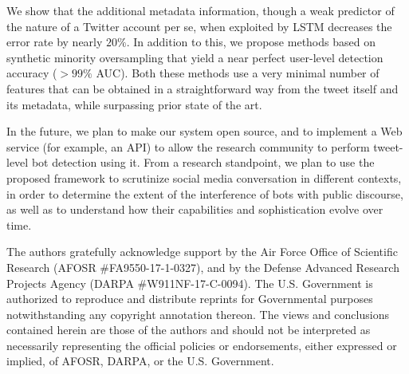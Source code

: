 We show that the additional metadata information, though a weak predictor of the nature of a Twitter account per se, when exploited by LSTM decreases the error rate by nearly $20\%$. In addition to this, we propose methods based on synthetic minority oversampling that yield a near perfect user-level detection accuracy ($>99\%$ AUC). Both these methods use a very minimal number of features that can be obtained in a straightforward way from the tweet itself and its metadata, while  surpassing prior state of the art. 

In the future, we plan to make our system open source, and to implement a Web service (for example, an API) to allow the research community to perform tweet-level bot detection using it. From a research standpoint, we plan to use the proposed framework to scrutinize social media conversation in different contexts, in order to determine the extent of the interference of bots with public discourse, as well as to understand how their capabilities and sophistication evolve over time.

\begin{acks}
\footnotesize{The authors gratefully acknowledge support by the Air Force Office of Scientific Research (AFOSR \#FA9550-17-1-0327), and by the Defense Advanced Research Projects Agency (DARPA \#W911NF-17-C-0094). The U.S. Government is authorized to reproduce and distribute reprints for Governmental purposes notwithstanding any copyright annotation thereon. The views and conclusions contained herein are those of the authors and should not be interpreted as necessarily representing the official policies or endorsements, either expressed or implied, of AFOSR, DARPA, or the U.S. Government.}
\end{acks}




\balance


